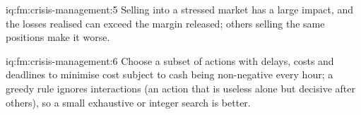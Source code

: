 \begin{solution}{iq:fm:crisis-management:5}
Selling into a stressed market has a large impact, and the losses realised can exceed the margin released; others selling the same positions make it
worse.
\end{solution}

\begin{solution}{iq:fm:crisis-management:6}
Choose a subset of actions with delays, costs and deadlines to minimise cost subject to cash being non-negative every hour; a greedy rule ignores
interactions (an action that is useless alone but decisive after others), so a small exhaustive or integer search is better.
\end{solution}

